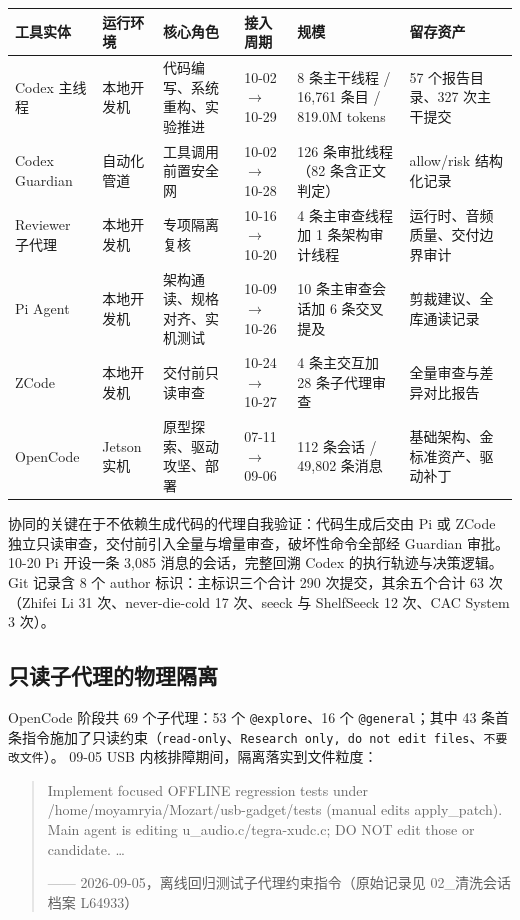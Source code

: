 \documentclass[11pt,a4paper]{ctexart}
\newcommand{\code}[1]{\texttt{#1}}
\begin{document}
\begin{table}[H]\centering\footnotesize
\begin{tabularx}{\textwidth}{@{}p{2.5cm} p{1.55cm} p{2.55cm} p{1.75cm} Y p{3.3cm}@{}}
\toprule
工具实体 & 运行环境 & 核心角色 & 接入周期 & 规模 & 留存资产 \\
\midrule
Codex 主线程 & 本地开发机 & 代码编写、系统重构、实验推进 & 10-02 $\rightarrow$ 10-29 & 8 条主干线程 / 16,761 条目 / 819.0M tokens & 57 个报告目录、327 次主干提交 \\
Codex Guardian & 自动化管道 & 工具调用前置安全网 & 10-02 $\rightarrow$ 10-28 & 126 条审批线程（82 条含正文判定） & allow/risk 结构化记录 \\
Reviewer 子代理 & 本地开发机 & 专项隔离复核 & 10-16 $\rightarrow$ 10-20 & 4 条主审查线程加 1 条架构审计线程 & 运行时、音频质量、交付边界审计 \\
Pi Agent & 本地开发机 & 架构通读、规格对齐、实机测试 & 10-09 $\rightarrow$ 10-26 & 10 条主审查会话加 6 条交叉提及 & 剪裁建议、全库通读记录 \\
ZCode & 本地开发机 & 交付前只读审查 & 10-24 $\rightarrow$ 10-27 & 4 条主交互加 28 条子代理审查 & 全量审查与差异对比报告 \\
OpenCode & Jetson 实机 & 原型探索、驱动攻坚、部署 & 07-11 $\rightarrow$ 09-06 & 112 条会话 / 49,802 条消息 & 基础架构、金标准资产、驱动补丁 \\
\bottomrule
\end{tabularx}
\end{table}

协同的关键在于不依赖生成代码的代理自我验证：代码生成后交由 Pi 或 ZCode 独立只读审查，交付前引入全量与增量审查，破坏性命令全部经 Guardian 审批。
10-20 Pi 开设一条 3,085 消息的会话，完整回溯 Codex 的执行轨迹与决策逻辑。
Git 记录含 8 个 author 标识：主标识三个合计 290 次提交，其余五个合计 63 次（Zhifei Li 31 次、never-die-cold 17 次、seeck 与 ShelfSeeck 12 次、CAC System 3 次）。

\subsection{只读子代理的物理隔离}

OpenCode 阶段共 69 个子代理：53 个 \code{@explore}、16 个 \code{@general}；其中 43 条首条指令施加了只读约束（\code{read-only}、\code{Research only, do not edit files}、\code{不要改文件}）。
09-05 USB 内核排障期间，隔离落实到文件粒度：

\begin{quote}\small
Implement focused OFFLINE regression tests under /home/moyamryia/Mozart/usb-gadget/tests (manual edits apply\_patch). Main agent is editing u\_audio.c/tegra-xudc.c; DO NOT edit those or candidate. \dots

—— 2026-09-05，离线回归测试子代理约束指令（原始记录见 02\_清洗会话档案 L64933）
\end{quote}
\end{document}
